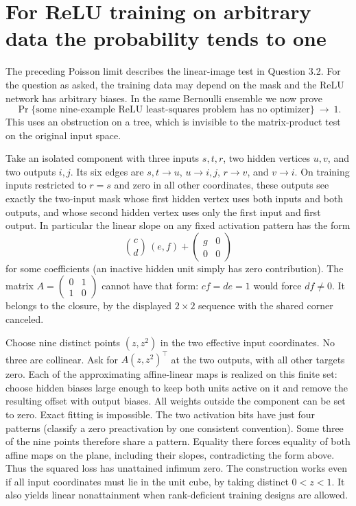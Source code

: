 \documentclass[10pt]{article}
\begin{document}
\section*{For ReLU training on arbitrary data the probability tends to one}
The preceding Poisson limit describes the linear-image test in Question 3.2. For the question as asked, the training data may depend on the mask and the ReLU network has arbitrary biases. In the same Bernoulli ensemble we now prove
\[
 \Pr\{\text{some nine-example ReLU least-squares problem has no optimizer}\}
 \ \longrightarrow\ 1 .
\]
This uses an obstruction on a tree, which is invisible to the matrix-product test on the original input space.

Take an isolated component with three inputs $s,t,r$, two hidden vertices $u,v$, and two outputs $i,j$. Its six edges are $s,t\to u$, $u\to i,j$, $r\to v$, and $v\to i$. On training inputs restricted to $r=s$ and zero in all other coordinates, these outputs see exactly the two-input mask whose first hidden vertex uses both inputs and both outputs, and whose second hidden vertex uses only the first input and first output. In particular the linear slope on any fixed activation pattern has the form
\[
 \binom{c}{d}\,(e,f)+\begin{pmatrix}g&0\\0&0\end{pmatrix}
\]
for some coefficients (an inactive hidden unit simply has zero contribution). The matrix $A=\left(\begin{smallmatrix}0&1\\1&0\end{smallmatrix}\right)$ cannot have that form: $cf=de=1$ would force $df\ne0$. It belongs to the closure, by the displayed $2\times2$ sequence with the shared corner canceled.

Choose nine distinct points $(z,z^2)$ in the two effective input coordinates. No three are collinear. Ask for $A(z,z^2)^\top$ at the two outputs, with all other targets zero. Each of the approximating affine-linear maps is realized on this finite set: choose hidden biases large enough to keep both units active on it and remove the resulting offset with output biases. All weights outside the component can be set to zero. Exact fitting is impossible. The two activation bits have just four patterns (classify a zero preactivation by one consistent convention). Some three of the nine points therefore share a pattern. Equality there forces equality of both affine maps on the plane, including their slopes, contradicting the form above. Thus the squared loss has unattained infimum zero. The construction works even if all input coordinates must lie in the unit cube, by taking distinct $0<z<1$. It also yields linear nonattainment when rank-deficient training designs are allowed.
\end{document}
